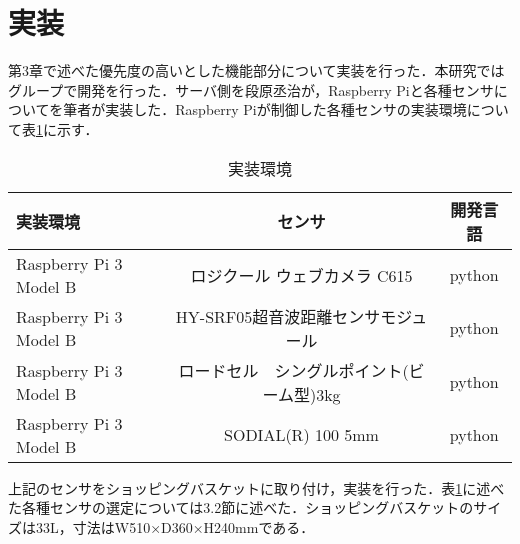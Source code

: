 

\section{実装}

第3章で述べた優先度の高いとした機能部分について実装を行った．本研究ではグループで開発を行った．サーバ側を段原丞治が，Raspberry Piと各種センサについてを筆者が実装した．Raspberry Piが制御した各種センサの実装環境について表\ref{jissou}に示す．


\begin{table}[htb]
\begin{center}
\caption{実装環境}
\begin{tabular}{|l|c|c|} \hline
実装環境 & センサ & 開発言語 \\ \hline \hline
Raspberry Pi 3 Model B & ロジクール ウェブカメラ C615 & python \\
Raspberry Pi 3 Model B & HY-SRF05超音波距離センサモジュール & python \\
Raspberry Pi 3 Model B & ロードセル　シングルポイント(ビーム型)3kg & python \\
Raspberry Pi 3 Model B & SODIAL(R) 100 5mm & python \\ \hline
\end{tabular}
\label{jissou}
\end{center}
\end{table}


上記のセンサをショッピングバスケットに取り付け，実装を行った．表\ref{jissou}に述べた各種センサの選定については3.2節に述べた．ショッピングバスケットのサイズは33L，寸法はW510×D360×H240mmである．






